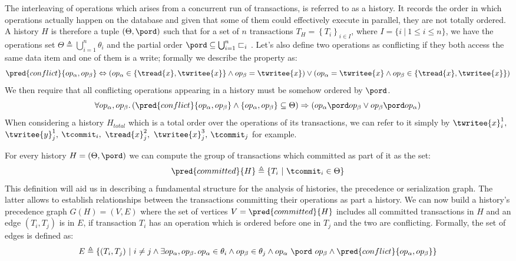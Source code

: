 The interleaving of operations which arises from a concurrent run of transactions, is referred to as a history. It records the order in which operations actually happen on the database and given that some of them could effectively execute in parallel, they are not totally ordered. A history $H$ is therefore a tuple $(\Theta, \pord)$ such that for a set of $n$ transactions $T_H = \left\lbrace T_i \right\rbrace_{i \in I}$, where $I = \{ i\ |\ 1 \leq i \leq n\}$, we have the operations set $\Theta \triangleq \bigcup_{i = 1}^{n} \theta_i$ and the partial order $\pord \subseteq \bigcup_{i = 1}^{n} \sqsubset_i$ \cite{ccontrol}. Let's also define two operations as conflicting if they both access the same data item and one of them is a write; formally we describe the property as:
\[
	\pred{conflict}{op_\alpha, op_\beta} \Leftrightarrow \left( op_\alpha \in \{ \tread{x}, \twritee{x} \} \land op_\beta = \twritee{x} \right) \lor \left( op_\alpha = \twritee{x} \land op_\beta \in \{ \tread{x}, \twritee{x} \} \right)
\]
We then require that all conflicting operations appearing in a history must be somehow ordered by $\pord$.
\[
	\forall op_\alpha, op_\beta \ldotp (\pred{conflict}{op_\alpha, op_\beta} \land\left\lbrace op_\alpha, op_\beta \right\rbrace \subseteq \Theta) \Rightarrow (op_\alpha \pord op_\beta \lor op_\beta \pord op_\alpha)
\]
When considering a history $H_{total}$ which is a total order over the operations of its transactions, we can refer to it simply by $\twritee{x}_i^1, $ $\twritee{y}_j^1, $ $\tcommit_i, $ $\tread{x}_j^2, $ $\twritee{x}_j^3, $ $\tcommit_j$ for example.

For every history $H = (\Theta, \pord)$ we can compute the group of transactions which committed as part of it as the set:
\[
	\pred{committed}{H} \triangleq \{ T_i\ |\ \tcommit_i \in \Theta \}
\]
This definition will aid us in describing a fundamental structure for the analysis of histories, the precedence or serialization graph. The latter allows to establish relationships between the transactions committing their operations as part a history. We can now build a history's precedence graph \cite{dbconcepts} $G(H) = (V, E)$ where the set of vertices $V = \pred{committed}{H}$ includes all committed transactions in $H$ and an edge $(T_i, T_j)$ is in $E$, if transaction $T_i$ has an operation which is ordered before one in $T_j$ and the two are conflicting. Formally, the set of edges is defined as:
\[
	E \triangleq \{ (T_i, T_j)\ |\ i \neq j \land \exists op_\alpha, op_\beta \ldotp op_\alpha \in \theta_i \land op_\beta \in \theta_j \land op_\alpha\ \pord\ op_\beta \land \pred{conflict}{op_\alpha, op_\beta} \}
\]

